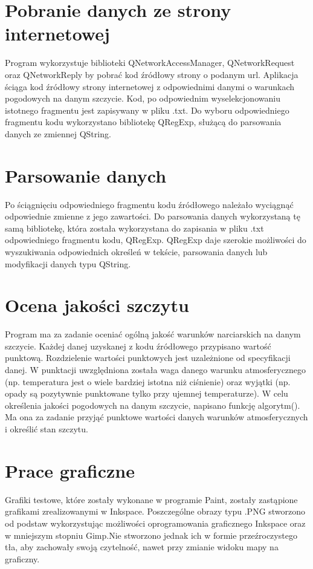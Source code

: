 \documentclass[10pt, a4paper]{article}
\begin{document}
\section{Pobranie danych ze strony internetowej} 
Program wykorzystuje biblioteki QNetworkAccessManager, QNetworkRequest oraz QNetworkReply by pobrać kod źródłowy strony o podanym url. 
Aplikacja ściąga kod źródłowy strony internetowej z odpowiednimi danymi o warunkach pogodowych na danym szczycie. Kod, po odpowiednim wyselekcjonowaniu istotnego fragmentu jest zapisywany w pliku .txt. Do wyboru odpowiedniego fragmentu kodu wykorzystano bibliotekę QRegExp, służącą do parsowania danych ze zmiennej QString. 

\section{Parsowanie danych} 
Po ściągnięciu odpowiedniego fragmentu kodu źródłowego należało wyciągnąć odpowiednie zmienne z jego zawartości. Do parsowania danych wykorzystaną tę samą bibliotekę, która została wykorzystana do zapisania w pliku .txt odpowiedniego fragmentu kodu, QRegExp. QRegExp daje szerokie możliwości do wyszukiwania odpowiednich określeń w tekście, parsowania danych lub modyfikacji danych typu QString. 
\section{Ocena jakości szczytu} 
Program ma za zadanie oceniać ogólną jakość warunków narciarskich na danym szczycie.
Każdej danej uzyskanej z kodu źródłowego przypisano wartość punktową. Rozdzielenie wartości punktowych jest uzależnione od specyfikacji danej. W punktacji uwzględniona została waga danego warunku atmosferycznego (np. temperatura jest o wiele bardziej istotna niż ciśnienie) oraz wyjątki (np. opady są pozytywnie punktowane tylko przy ujemnej temperaturze).
W celu określenia jakości pogodowych na danym szczycie, napisano funkcję algorytm(). Ma ona za zadanie przyjąć punktowe wartości danych warunków atmosferycznych i określić stan szczytu. 
\section{Prace graficzne} 
Grafiki testowe, które zostały wykonane w programie Paint, zostały zastąpione grafikami zrealizowanymi w Inkspace. Poszczególne obrazy typu .PNG stworzono od podstaw wykorzystując możliwości oprogramowania graficznego Inkspace oraz w mniejszym stopniu Gimp.Nie stworzono jednak ich w formie przeźroczystego tła, aby zachowały swoją czytelność, nawet przy zmianie widoku mapy na graficzny.  
\end{document}
